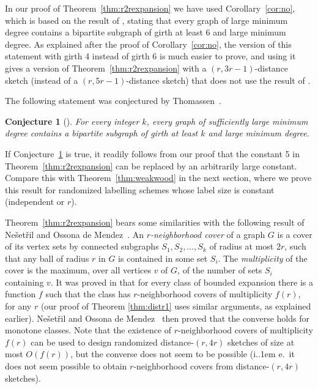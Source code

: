 \documentclass[11pt]{article}
\newcommand*\ie{i.\kern.1em e.\ }
\newtheorem{conj}[thm]{Conjecture}
\theoremstyle{definition}
\begin{document}
In our proof of Theorem~\ref{thm:r2rexpansion} we have used
Corollary~\ref{cor:no}, which is based on the result of \cite{KO04}, stating that every graph of
large minimum degree contains a bipartite subgraph of girth at least 6
and large minimum degree. As explained after the proof of
Corollary~\ref{cor:no}, the version of this statement with girth 4
instead of girth 6 is much easier to prove, and using  it gives a version of 
Theorem~\ref{thm:r2rexpansion} with a $(r,3r-1)$-distance sketch
(instead of a $(r,5r-1)$-distance sketch) that does not use the result
of \cite{KO04}.

The following statement was
conjectured by Thomassen~\cite{Tho83}.

\begin{conj}[\cite{Tho83}]\label{conj:thom}
For every integer $k$, every graph of
sufficiently large minimum degree contains a bipartite subgraph of girth at least $k$
and large minimum degree.
\end{conj}

If Conjecture~\ref{conj:thom} is true, it readily follows from our proof that the constant 5 in
Theorem~\ref{thm:r2rexpansion} can be replaced by an arbitrarily large constant. Compare this with
Theorem~\ref{thm:weakwood} in the next section, where we prove this result for randomized labelling
schemes whose label size is constant (independent or $r$).

 

Theorem~\ref{thm:r2rexpansion} bears some similarities with the following result of Ne\v set\v ril
and Ossona de Mendez~\cite{NO15}. An \emph{$r$-neighborhood cover} of a graph $G$ is a cover of its
vertex sets by connected subgraphs $S_1,S_2,\ldots,S_k$ of radius at most $2r$, such that  any ball
of radius $r$ in $G$ is contained in some set $S_i$. The \emph{multiplicity} of the cover is the
maximum, over all vertices $v$ of $G$, of the number of sets $S_i$ containing $v$. It was proved in
\cite{GKS17} that for every class of bounded expansion there is a function $f$ such that the class
has $r$-neighborhood covers of multiplicity $f(r)$, for any $r$ (our proof of Theorem
\ref{thm:distr1} uses similar arguments, as explained earlier). Ne\v set\v ril and Ossona de
Mendez~\cite{NO15} then proved that the converse holds for monotone classes. Note that the existence
of $r$-neighborhood covers of multiplicity $f(r)$ can be used to design randomized
distance-$(r,4r)$ sketches of size at most $O(f(r))$, but the converse does not
seem to be possible (\ie it does not seem possible to obtain $r$-neighborhood covers from
distance-$(r,4r)$ sketches). 
\end{document}
